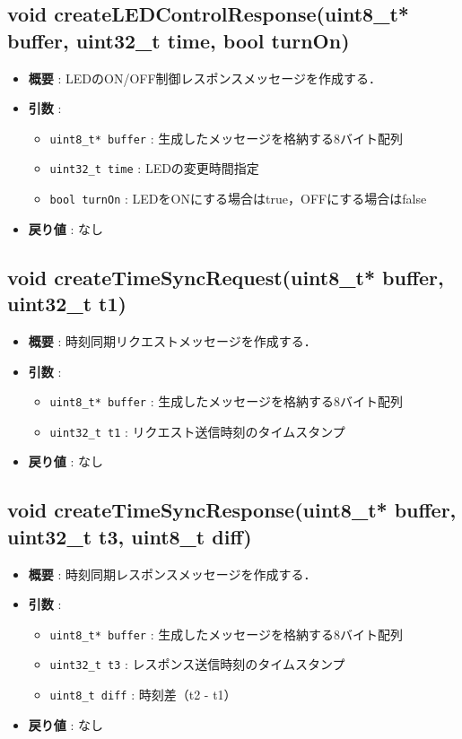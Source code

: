\documentclass[a4paper,12pt]{article}
\begin{document}
\subsection{void createLEDControlResponse(uint8\_t* buffer, uint32\_t time, bool turnOn)}
\begin{itemize}
  \item \textbf{概要} : LEDのON/OFF制御レスポンスメッセージを作成する．
  \item \textbf{引数} :
  \begin{itemize}
    \item \texttt{uint8\_t* buffer} : 生成したメッセージを格納する8バイト配列
    \item \texttt{uint32\_t time} : LEDの変更時間指定
    \item \texttt{bool turnOn} : LEDをONにする場合はtrue，OFFにする場合はfalse
  \end{itemize}
  \item \textbf{戻り値} : なし
\end{itemize}

\subsection{void createTimeSyncRequest(uint8\_t* buffer, uint32\_t t1)}
\begin{itemize}
  \item \textbf{概要} : 時刻同期リクエストメッセージを作成する．
  \item \textbf{引数} :
  \begin{itemize}
    \item \texttt{uint8\_t* buffer} : 生成したメッセージを格納する8バイト配列
    \item \texttt{uint32\_t t1} : リクエスト送信時刻のタイムスタンプ
  \end{itemize}
  \item \textbf{戻り値} : なし
\end{itemize}

\subsection{void createTimeSyncResponse(uint8\_t* buffer, uint32\_t t3, uint8\_t diff)}
\begin{itemize}
  \item \textbf{概要} : 時刻同期レスポンスメッセージを作成する．
  \item \textbf{引数} :
  \begin{itemize}
    \item \texttt{uint8\_t* buffer} : 生成したメッセージを格納する8バイト配列
    \item \texttt{uint32\_t t3} : レスポンス送信時刻のタイムスタンプ
    \item \texttt{uint8\_t diff} : 時刻差（t2 - t1）
  \end{itemize}
  \item \textbf{戻り値} : なし
\end{itemize}
\end{document}
